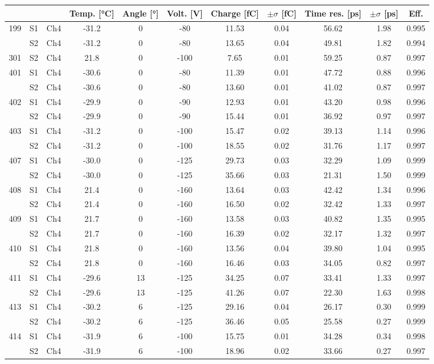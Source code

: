 \begin{tabular}{ccccccccccc}
\toprule
 &  &  & Temp. [°C] & Angle [°] & Volt. [V] & Charge [fC] & \(\pm\sigma\) [fC] & Time res. [ps] & \(\pm\sigma\) [ps] & Eff. \\
\midrule
199 & S1 & Ch4 & -31.2 & 0 & -80 & 11.53 & 0.04 & 56.62 & 1.98 & 0.995 \\
 & S2 & Ch4 & -31.2 & 0 & -80 & 13.65 & 0.04 & 49.81 & 1.82 & 0.994 \\
301 & S2 & Ch4 & 21.8 & 0 & -100 & 7.65 & 0.01 & 59.25 & 0.87 & 0.997 \\
401 & S1 & Ch4 & -30.6 & 0 & -80 & 11.39 & 0.01 & 47.72 & 0.88 & 0.996 \\
 & S2 & Ch4 & -30.6 & 0 & -80 & 13.60 & 0.01 & 41.02 & 0.87 & 0.997 \\
402 & S1 & Ch4 & -29.9 & 0 & -90 & 12.93 & 0.01 & 43.20 & 0.98 & 0.996 \\
 & S2 & Ch4 & -29.9 & 0 & -90 & 15.44 & 0.01 & 36.92 & 0.97 & 0.997 \\
403 & S1 & Ch4 & -31.2 & 0 & -100 & 15.47 & 0.02 & 39.13 & 1.14 & 0.996 \\
 & S2 & Ch4 & -31.2 & 0 & -100 & 18.55 & 0.02 & 31.76 & 1.17 & 0.997 \\
407 & S1 & Ch4 & -30.0 & 0 & -125 & 29.73 & 0.03 & 32.29 & 1.09 & 0.999 \\
 & S2 & Ch4 & -30.0 & 0 & -125 & 35.66 & 0.03 & 21.31 & 1.50 & 0.999 \\
408 & S1 & Ch4 & 21.4 & 0 & -160 & 13.64 & 0.03 & 42.42 & 1.34 & 0.996 \\
 & S2 & Ch4 & 21.4 & 0 & -160 & 16.50 & 0.02 & 32.42 & 1.33 & 0.997 \\
409 & S1 & Ch4 & 21.7 & 0 & -160 & 13.58 & 0.03 & 40.82 & 1.35 & 0.995 \\
 & S2 & Ch4 & 21.7 & 0 & -160 & 16.39 & 0.02 & 32.17 & 1.32 & 0.997 \\
410 & S1 & Ch4 & 21.8 & 0 & -160 & 13.56 & 0.04 & 39.80 & 1.04 & 0.995 \\
 & S2 & Ch4 & 21.8 & 0 & -160 & 16.46 & 0.03 & 34.05 & 0.82 & 0.997 \\
411 & S1 & Ch4 & -29.6 & 13 & -125 & 34.25 & 0.07 & 33.41 & 1.33 & 0.997 \\
 & S2 & Ch4 & -29.6 & 13 & -125 & 41.26 & 0.07 & 22.30 & 1.63 & 0.998 \\
413 & S1 & Ch4 & -30.2 & 6 & -125 & 29.16 & 0.04 & 26.17 & 0.30 & 0.999 \\
 & S2 & Ch4 & -30.2 & 6 & -125 & 36.46 & 0.05 & 25.58 & 0.27 & 0.999 \\
414 & S1 & Ch4 & -31.9 & 6 & -100 & 15.75 & 0.01 & 34.28 & 0.34 & 0.998 \\
 & S2 & Ch4 & -31.9 & 6 & -100 & 18.96 & 0.02 & 33.66 & 0.27 & 0.997 \\
\bottomrule
\end{tabular}

